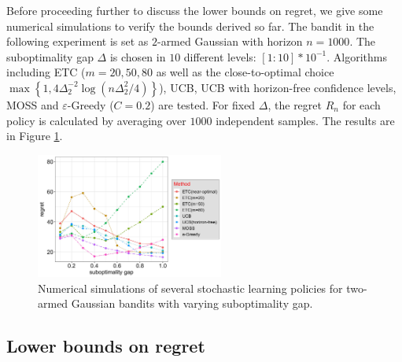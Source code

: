 \documentclass[10pt,a4paper]{amsart}
\numberwithin{equation}{section}
\theoremstyle{plain}
\theoremstyle{definition}
\def\e{{\varepsilon}}
\begin{document}
Before proceeding further to discuss the lower bounds on regret, we give some numerical simulations to verify the bounds derived so far. The bandit in the following experiment is set as $2$-armed Gaussian with horizon $n=1000$. The suboptimality gap $\Delta$ is chosen in $10$ different levels: $[1:10]*10^{-1}$.  Algorithms including ETC ($m=20, 50, 80$ as well as the close-to-optimal choice $\max\left\{1, 4\Delta_2^{-2}\log(n\Delta_2^2/4)\right\}$), UCB, UCB with horizon-free confidence levels, MOSS and $\e$-Greedy ($C=0.2$) are tested. For fixed $\Delta$, the regret $R_n$ for each policy is calculated by averaging over $1000$ independent samples. The results are in Figure \ref{fig:1}. 
\begin{figure}[ht]
\centering
\includegraphics[width = 0.55\textwidth,clip,trim = 1cm 0cm 0cm 0cm]{sb}
\caption{Numerical simulations of several stochastic learning policies for two-armed Gaussian bandits with varying suboptimality gap.}
  \label{fig:1}
\end{figure}



\subsection{Lower bounds on regret}
\end{document}

